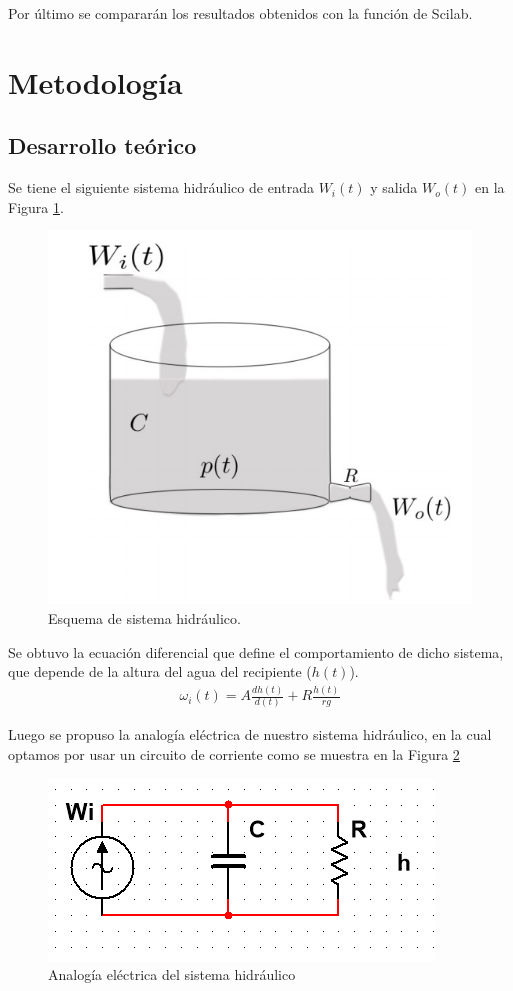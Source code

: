 \documentclass{article}
\begin{document}
	Por último se compararán los resultados obtenidos con la función de Scilab.

	\section{Metodología}
	\subsection{Desarrollo teórico}
	
	Se tiene el siguiente sistema hidráulico de entrada $ W_i(t) $ y salida $W_o(t) $ en la Figura \ref{hidr}.
	
	\begin{figure}[H]
		\centering
		\includegraphics[width=0.55\linewidth]{hidr}
		\caption{Esquema de sistema hidráulico.}
		\label{hidr}
	\end{figure}
	
	
	Se obtuvo la ecuación diferencial que define el comportamiento de dicho sistema, que depende de la altura del agua del recipiente ($ h(t) $).	
	\begin{align}
	\omega_i(t)=A\frac{dh(t)}{d(t)}+R\frac{h(t)}{rg}
	\end{align}
	
	
	 Luego se propuso la analogía eléctrica de nuestro sistema hidráulico, en la cual optamos por usar un circuito de corriente como se muestra en la Figura \ref{circ}
	
	\begin{figure}[H]
		\centering
		\includegraphics[width=0.7\linewidth]{circuito}
		\centering
		\caption{Analogía eléctrica del sistema hidráulico}
		\label{circ}
	\end{figure}
	  
\end{document}
